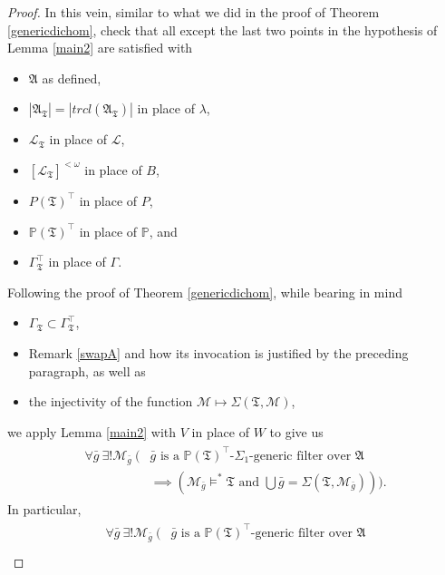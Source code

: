 \documentclass[12pt]{article}
\numberwithin{equation}{section}
\begin{document}
\begin{proof}
In this vein, similar to what we did in the proof of Theorem \ref{genericdichom}, check that all except the last two points in the hypothesis of Lemma \ref{main2} are satisfied with 
\begin{itemize}
    \item $\mathfrak{A}$ as defined,
    \item $|\mathfrak{A}_{\mathfrak{T}}| = |trcl(\mathfrak{A}_{\mathfrak{T}})|$ in place of $\lambda$,
    \item $\mathcal{L}_{\mathfrak{T}}$ in place of $\mathcal{L}$,
    \item $[\mathcal{L}_{\mathfrak{T}}]^{< \omega}$ in place of $B$,
    \item $P(\mathfrak{T})^{\top}$ in place of $P$,
    \item $\mathbb{P}(\mathfrak{T})^{\top}$ in place of $\mathbb{P}$, and
    \item $\Gamma_{\mathfrak{T}}^{\top}$ in place of $\Gamma$.
\end{itemize} 
Following the proof of Theorem \ref{genericdichom}, while bearing in mind
\begin{itemize}
    \item $\Gamma_{\mathfrak{T}} \subset \Gamma_{\mathfrak{T}}^{\top}$,
    \item Remark \ref{swapA} and how its invocation is justified by the preceding paragraph, as well as
    \item the injectivity of the function $\mathcal{M} \mapsto \Sigma(\mathfrak{T}, \mathcal{M})$, 
\end{itemize}
we apply Lemma \ref{main2} with $V$ in place of $W$ to give us 
\begin{align}\label{marker0}
\begin{split}
    \forall \bar{g} \ \exists ! \mathcal{M}_{\bar{g}} \ ( & \bar{g} \text{ is a } \mathbb{P}(\mathfrak{T})^{\top} \text{-} \Sigma_1 \text{-generic filter over } \mathfrak{A} \\ 
    & \implies (\mathcal{M}_{\bar{g}} \models^* \mathfrak{T} \text{ and } \bigcup \bar{g} = \Sigma(\mathfrak{T}, \mathcal{M}_{\bar{g}}))) \text{.}
\end{split}
\end{align}
In particular,
\begin{align}\label{marker}
\begin{split}
    \forall \bar{g} \ \exists ! \mathcal{M}_{\bar{g}} \ ( & \bar{g} \text{ is a } \mathbb{P}(\mathfrak{T})^{\top} \text{-generic filter over } \mathfrak{A} \\ 

\end{split}
\end{align}
\end{proof}
\end{document}
